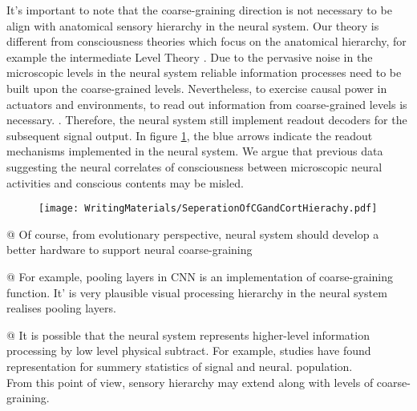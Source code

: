         It's important to note that the coarse-graining direction is not necessary to be align with  anatomical sensory hierarchy in the neural system. Our theory is different from consciousness theories which focus on the anatomical hierarchy, for example the intermediate Level Theory \citep[see also \ref{IntermediateLevelTheory}]{prinz2007intermediate, jackendoff1987consciousness}. Due to the pervasive noise in the microscopic levels in the neural system reliable information processes need to be built upon the coarse-grained levels. Nevertheless, to exercise causal power in actuators and environments, to read out information from coarse-grained levels is necessary. . Therefore, the neural system still implement readout decoders for the subsequent signal output. In figure \ref{fig:hierarchy}, the blue arrows indicate the readout mechanisms implemented in the neural system. We argue that previous data suggesting the neural correlates of consciousness between microscopic neural activities and conscious contents may be misled. 

        
			\begin{figure}[H]
				\texttt{[image: WritingMaterials/SeperationOfCGandCortHierachy.pdf]}
				\label{fig:hierarchy}
			\end{figure}


            \begin{WritingMaterials}
    			@ Of course, from evolutionary perspective, neural system should develop a better hardware to support neural coarse-graining

				@ For example, pooling layers in CNN is an implementation of coarse-graining function. It' is very plausible visual processing hierarchy in the neural system realises pooling layers.


				@ It is possible that the neural system represents higher-level information processing by low level physical subtract. For example, studies have found representation for summery statistics of signal and neural. population.\\
				From this point of view, sensory hierarchy may extend along with levels of coarse-graining.
            \end{WritingMaterials}
        

        
               
\rlend

